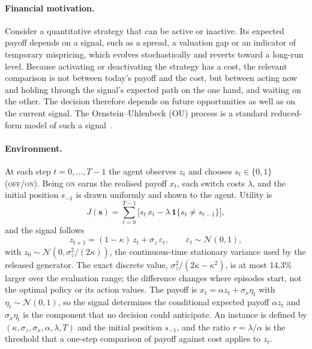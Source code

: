 \documentclass[10pt,a4paper,twocolumn]{article}
\newcommand{\J}{J}
\newcommand{\ON}{\textsc{on}}
\newcommand{\OFF}{\textsc{off}}
\newcommand{\sigz}{\sigma_z}
\newcommand{\sigx}{\sigma_x}
\begin{document}
\paragraph{Financial motivation.} Consider a quantitative strategy that can be active or inactive. Its expected payoff depends on a signal, such as a spread, a valuation gap or an indicator of temporary mispricing, which evolves stochastically and reverts toward a long-run level. Because activating or deactivating the strategy has a cost, the relevant comparison is not between today's payoff and the cost, but between acting now and holding through the signal's expected path on the one hand, and waiting on the other. The decision therefore depends on future opportunities as well as on the current signal. The Ornstein--Uhlenbeck (OU) process is a standard reduced-form model of such a signal~\cite{elliott2005,bertram2010,leung2015}.

\paragraph{Environment.} At each step $t=0,\dots,T{-}1$ the agent observes $z_t$ and chooses $s_t\in\{0,1\}$ (\OFF/\ON). Being \ON{} earns the realised payoff $x_t$, each switch costs $\lambda$, and the initial position $s_{-1}$ is drawn uniformly and shown to the agent. Utility is
\begin{equation}
\J(\mathbf{s})=\sum_{t=0}^{T-1}\Big[s_t\,x_t-\lambda\,\mathbf{1}\{s_t\neq s_{t-1}\}\Big],
\label{eq:J}
\end{equation}
and the signal follows
\begin{equation}
z_{t+1}=(1-\kappa)\,z_t+\sigz\,\varepsilon_t,\qquad \varepsilon_t\sim\mathcal N(0,1),
\label{eq:ou}
\end{equation}
with $z_0\sim\mathcal N(0,\sigz^2/(2\kappa))$, the continuous-time stationary variance used by the released generator. The exact discrete value, $\sigz^2/(2\kappa-\kappa^2)$, is at most 14.3\% larger over the evaluation range; the difference changes where episodes start, not the optimal policy or its action values. The payoff is $x_t=\alpha z_t+\sigx\eta_t$ with $\eta_t\sim\mathcal N(0,1)$, so the signal determines the conditional expected payoff $\alpha z_t$ and $\sigx\eta_t$ is the component that no decision could anticipate. An instance is defined by $(\kappa,\sigz,\sigx,\alpha,\lambda,T)$ and the initial position $s_{-1}$, and the ratio $r=\lambda/\alpha$ is the threshold that a one-step comparison of payoff against cost applies to $z_t$.
\end{document}
